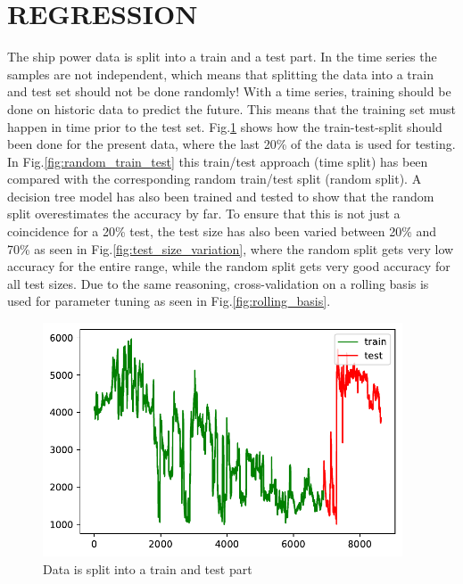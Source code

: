 \section*{REGRESSION}\label{regression}
The ship power data is split into a train and a test part. In the time
series the samples are not independent, which means that splitting the
data into a train and test set should not be done randomly! With a time
series, training should be done on historic data to predict the future.
This means that the training set must happen in time prior to the test
set. Fig.\ref{fig:train_test} shows how the train-test-split
should been done for the present data, where the last 20\% of the data
is used for testing.
In Fig.\ref{fig:random_train_test} this train/test approach
(time split) has been compared with the corresponding random train/test
split (random split). A decision tree model has also been trained and
tested to show that the random split overestimates the accuracy by far.
To ensure that this is not just a coincidence for a 20\% test, the test
size has also been varied between 20\% and 70\% as seen in
Fig.\ref{fig:test_size_variation}, where the random split gets
very low accuracy for the entire range, while the random split gets very
good accuracy for all test sizes.
Due to the same reasoning, cross-validation on a rolling basis is used
for parameter tuning as seen in Fig.\ref{fig:rolling_basis}.
\begin{figure}[H]
\begin{center}\includegraphics[width = 0.95\textwidth]{figures/train_test.pdf}\end{center}
\vspace{-0.7cm}
\caption{Data is split into a train and test part}
\label{fig:train_test}
\end{figure}
